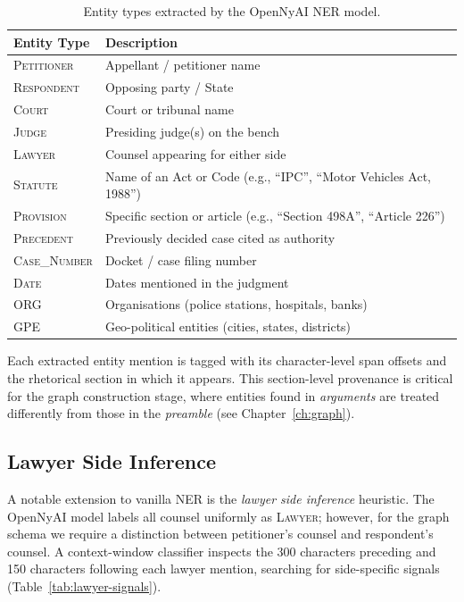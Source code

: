 \begin{table}[H]
\centering
\caption{Entity types extracted by the OpenNyAI NER model.}
\label{tab:entity-types}
\begin{tabular}{@{}ll@{}}
\toprule
\textbf{Entity Type} & \textbf{Description} \\
\midrule
\textsc{Petitioner}   & Appellant / petitioner name \\
\textsc{Respondent}    & Opposing party / State \\
\textsc{Court}         & Court or tribunal name \\
\textsc{Judge}         & Presiding judge(s) on the bench \\
\textsc{Lawyer}        & Counsel appearing for either side \\
\textsc{Statute}       & Name of an Act or Code (e.g., ``IPC'', ``Motor Vehicles Act, 1988'') \\
\textsc{Provision}     & Specific section or article (e.g., ``Section 498A'', ``Article 226'') \\
\textsc{Precedent}     & Previously decided case cited as authority \\
\textsc{Case\_Number}  & Docket / case filing number \\
\textsc{Date}          & Dates mentioned in the judgment \\
\textsc{ORG}           & Organisations (police stations, hospitals, banks) \\
\textsc{GPE}           & Geo-political entities (cities, states, districts) \\
\bottomrule
\end{tabular}
\end{table}

Each extracted entity mention is tagged with its character-level span offsets and the rhetorical section in which it appears. This section-level provenance is critical for the graph construction stage, where entities found in \emph{arguments} are treated differently from those in the \emph{preamble} (see Chapter~\ref{ch:graph}).

\subsection{Lawyer Side Inference}

A notable extension to vanilla NER is the \emph{lawyer side inference} heuristic. The OpenNyAI model labels all counsel uniformly as \textsc{Lawyer}; however, for the graph schema we require a distinction between petitioner's counsel and respondent's counsel. A context-window classifier inspects the 300 characters preceding and 150 characters following each lawyer mention, searching for side-specific signals (Table~\ref{tab:lawyer-signals}).


